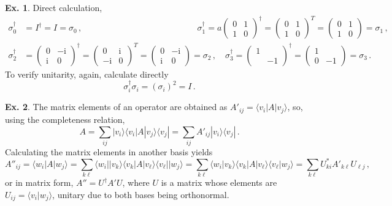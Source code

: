 \documentclass[a4paper,12pt]{article}
\def\imagi{\mathrm{i}}
\theoremstyle{definition}
\newtheorem{exercise}{Ex.}[section]
\begin{document}
\begin{exercise}
 Direct calculation,
 \[
  \begin{aligned}
   \sigma_0^\dagger &= I^\dagger = I = \sigma_0\,,\quad\quad\quad\quad\quad\quad\quad\quad\quad\quad\quad\quad\quad\ \,
   \sigma_1^\dagger = a\begin{pmatrix} 0 & 1 \\ 1 & 0 \end{pmatrix}^\dagger = \begin{pmatrix} 0 & 1 \\ 1 & 0 \end{pmatrix}^T = \begin{pmatrix} 0 & 1 \\ 1 & 0 \end{pmatrix} = \sigma_1\,,\\
   \sigma_2^\dagger &= \begin{pmatrix} 0 & -\imagi\\ \imagi & 0 \end{pmatrix}^\dagger = \begin{pmatrix} 0 & \imagi \\ -\imagi & 0 \end{pmatrix}^T = \begin{pmatrix} 0 & -\imagi \\ \imagi & 0 \end{pmatrix} = \sigma_2\,,\quad \sigma_3^\dagger = \begin{pmatrix} 1 & \\ & -1 \end{pmatrix}^\dagger = \begin{pmatrix} 1 & \\ 0 & -1 \end{pmatrix} = \sigma_3\,.
  \end{aligned}
 \]
To verify unitarity, again, calculate directly
\[
 \sigma_i^\dagger\sigma_i = (\sigma_i)^2 = I\,.
\]
\end{exercise}

\begin{exercise}
 The matrix elements of an operator are obtained as $A'_{ij}=\langle v_i | A|v_j\rangle$, so, using the completeness relation,
 \[
  A = \sum_{ij}|v_i\rangle\langle v_i |A|v_j\rangle\langle v_j| = \sum_{ij}A'_{ij}|v_i\rangle\langle v_j|\,.
 \]
 Calculating the matrix elements in another basis yields
 \[
  A''_{ij} = \langle w_i | A | w_j\rangle = \sum_{k\ell} \langle w_i | |v_k\rangle\langle v_k | A | v_\ell\rangle\langle v_\ell || w_j\rangle = \sum_{k\ell}\langle w_i | v_k\rangle \langle v_k | A| v_\ell \rangle \langle v_\ell|w_j\rangle = \sum_{k\ell} U_{k i}^* A'_{k\ell} U_{\ell j}\,,
 \]
 or in matrix form, $A''=U^\dagger A' U$, where $U$ is a matrix whose elements are $U_{ij} = \langle v_i|w_j\rangle$, unitary due to both bases being orthonormal.
\end{exercise}
\end{document}
